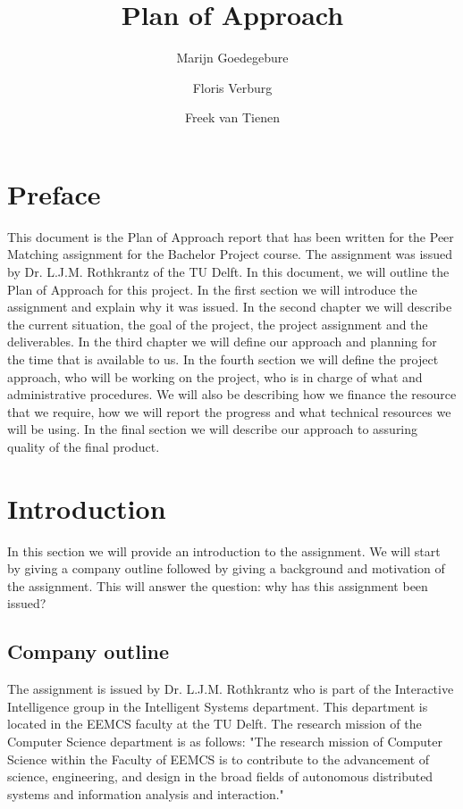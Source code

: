\documentclass[]{article}
\title{Plan of Approach}
\author{Marijn Goedegebure \and
	Floris Verburg \and
	Freek van Tienen}
\date{}
\begin{document}
\maketitle

\newpage

\tableofcontents

\newpage
\section{Preface}
This document is the Plan of Approach report that has been written for the Peer Matching assignment for the Bachelor Project course.
The assignment was issued by Dr. L.J.M. Rothkrantz of the TU Delft.
In this document, we will outline the Plan of Approach for this project.
In the first section we will introduce the assignment and explain why it was issued.
In the second chapter we will describe the current situation, the goal of the project, the project assignment and the deliverables.
In the third chapter we will define our approach and planning for the time that is available to us.
In the fourth section we will define the project approach, who will be working on the project, who is in charge of what and administrative procedures.
We will also be describing how we finance the  resource that we require, how we will report the progress and what technical resources we will be using.
In the final section we will describe our approach to assuring quality of the final product.
\section{Introduction}
In this section we will provide an introduction to the assignment.
We will start by giving a company outline followed by giving a background and motivation of the assignment.
This will answer the question: why has this assignment been issued? 
\subsection{Company outline}
The assignment is issued by Dr. L.J.M. Rothkrantz who is part of the Interactive Intelligence group in the Intelligent Systems department.
This department is located in the EEMCS faculty at the TU Delft.
The research mission of the Computer Science department is as follows:
"The research mission of Computer Science within the Faculty of EEMCS is to contribute to the advancement of science, engineering, and design in the broad fields of autonomous distributed systems and information analysis and interaction."\cite{cstudelftnl}
\end{document}
